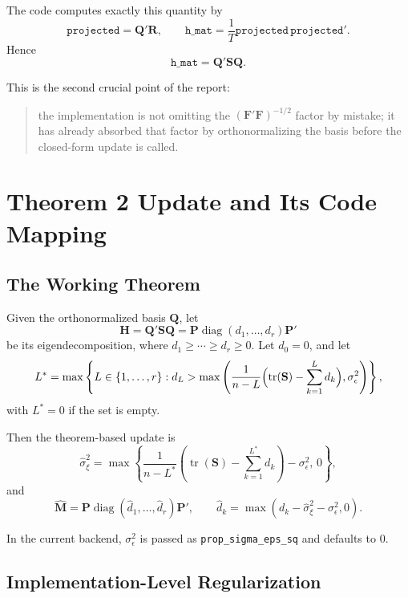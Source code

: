 \documentclass[11pt]{article}
\newcommand{\bF}{\mathbf{F}}
\newcommand{\bQ}{\mathbf{Q}}
\newcommand{\bM}{\mathbf{M}}
\newcommand{\bS}{\mathbf{S}}
\newcommand{\bH}{\mathbf{H}}
\newcommand{\bP}{\mathbf{P}}
\newcommand{\diag}{\operatorname{diag}}
\newcommand{\tr}{\operatorname{tr}}
\begin{document}
The code computes exactly this quantity by
\[
\texttt{projected} = \bQ' \mathbf{R},
\qquad
\texttt{h\_mat} = \frac{1}{T}\texttt{projected}\,\texttt{projected}'.
\]
Hence
\[
\texttt{h\_mat} = \bQ' \bS \bQ.
\]

This is the second crucial point of the report:

\begin{quote}
the implementation is not omitting the \((\bF'\bF)^{-1/2}\) factor by mistake;
it has already absorbed that factor by orthonormalizing the basis before the
closed-form update is called.
\end{quote}

\section{Theorem 2 Update and Its Code Mapping}

\subsection{The Working Theorem}

Given the orthonormalized basis \(\bQ\), let
\[
\bH = \bQ' \bS \bQ = \bP \diag(d_1,\ldots,d_r)\bP'
\]
be its eigendecomposition, where \(d_1 \ge \cdots \ge d_r \ge 0\). Let
\(d_0 = 0\), and let
\[
L^* = \max \left\{
L \in \{1,\ldots,r\} :
d_L >
\max\left(
\frac{1}{n-L}\Bigl(\tr(\bS) - \sum_{k=1}^L d_k\Bigr),
\sigma_\epsilon^2
\right)
\right\},
\]
with \(L^* = 0\) if the set is empty.

Then the theorem-based update is
\begin{equation}
\widehat{\sigma}_\xi^2
=
\max\left\{
\frac{1}{n-L^*}
\left(
\tr(\bS) - \sum_{k=1}^{L^*} d_k
\right)
- \sigma_\epsilon^2,
\, 0
\right\},
\label{eq:sig-update}
\end{equation}
and
\begin{equation}
\widehat{\bM}
=
\bP \diag(\widehat d_1,\ldots,\widehat d_r)\bP',
\qquad
\widehat d_k = \max(d_k - \widehat{\sigma}_\xi^2 - \sigma_\epsilon^2, 0).
\label{eq:m-update}
\end{equation}

In the current backend, \(\sigma_\epsilon^2\) is passed as
\texttt{prop\_sigma\_eps\_sq} and defaults to \(0\).

\subsection{Implementation-Level Regularization}
\end{document}
